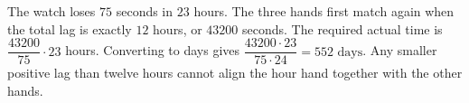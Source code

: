 The watch loses $75$ seconds in $23$ hours. The three hands first match again when the total lag is exactly $12$ hours, or $43200$ seconds. The required actual time is $\dfrac{43200}{75}\cdot23$ hours. Converting to days gives $\dfrac{43200\cdot23}{75\cdot24}=\boxed{552\text{ days}}$. Any smaller positive lag than twelve hours cannot align the hour hand together with the other hands.
